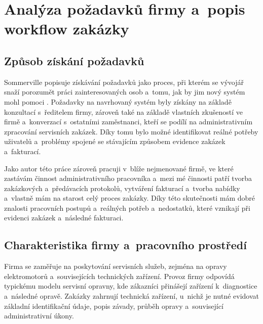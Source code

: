 \chapter{Analýza požadavků firmy a~popis workflow zakázky}\label{kap:analyza-workflow}\label{kap:analyza-procesu}

\section{Způsob získání požadavků}

Sommerville popisuje získávání požadavků jako proces, při kterém se vývojář snaží porozumět práci zainteresovaných osob a~tomu, jak by jim nový systém mohl pomoci \cite[s.~112]{Sommerville2016}. Požadavky na navrhovaný systém byly získány na základě konzultací s~ředitelem firmy, zároveň také na základě vlastních zkušeností ve firmě a~konverzací s~ostatními zaměstnanci, kteří se podílí na administrativním zpracování servisních zakázek. Díky tomu bylo možné identifikovat reálné potřeby uživatelů a~problémy spojené se stávajícím způsobem evidence zakázek a~fakturací.

Jako autor této práce zároveň pracuji v~blíže nejmenované firmě, ve které zastávám činnost administrativního pracovníka a~mezi mé činnosti patří tvorba zakázkových a~předávacích protokolů, vytváření fakturací a~tvorba nabídky a~vlastně mám na starost celý proces zakázky. Díky této skutečnosti mám dobré znalosti pracovních postupů a~reálných potřeb a~nedostatků, které vznikají při evidenci zakázek a~následné fakturaci.

\section{Charakteristika firmy a~pracovního prostředí}

Firma se zaměřuje na poskytování servisních služeb, zejména na opravy elektromotorů a~souvisejících technických zařízení. Provoz firmy odpovídá typickému modelu servisní opravny, kde zákazníci přinášejí zařízení k~diagnostice a~následné opravě. Zakázky zahrnují technická zařízení, u~nichž je nutné evidovat základní identifikační údaje, popis závady, průběh opravy a~související administrativní úkony.

